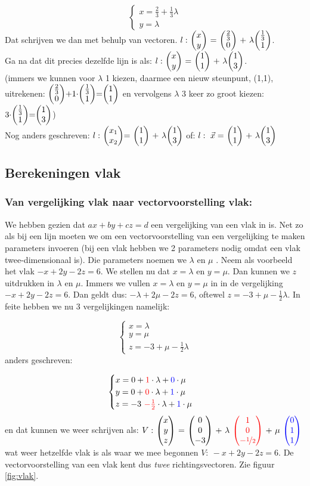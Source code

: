 \[\begin{cases}
x = \frac{2}{3} + \frac{1}{3} \lambda\\
y =  \lambda 
\end{cases}
\] 
Dat schrijven we dan met behulp van vectoren. 
$ l: \  \vectwee {x}{y} \ = \ \vectwee {\frac{2}{3}}{0} \ +\  \lambda  \vectwee {\frac{1}{3}}{1}  $.\\
Ga na dat dit precies dezelfde lijn is als:
$ l: \  \vectwee {x}{y} \ = \ \vectwee {1}{1} \ +\  \lambda  \vectwee {1}{3}  $.\\ (immers we kunnen voor $ \lambda $ 1 kiezen, daarmee een nieuw steunpunt, (1,1), uitrekenen: $\vectwee{\frac{2}{3}}{0}+1\cdot\vectwee{\frac{1}{3}}{1}=\vectwee{1}{1} $ en vervolgens $ \lambda $ 3 keer zo groot kiezen: $3\cdot\vectwee{\frac{1}{3}}{1}=\vectwee{1}{3} $)\\
Nog anders geschreven:
$  l: \  \vectweesnel{x} =  \ \vectwee {1}{1} \ +\  \lambda  \vectwee {1}{3}  $ \qquad
of: $ l: \ \vec{x} = \ \vectwee{1}{1} \ + \ \lambda \vectwee {1}{3} $

\subsection{Berekeningen vlak}
\subsubsection{Van vergelijking vlak naar vectorvoorstelling vlak:}
We hebben gezien dat $ ax + by + cz = d $ een vergelijking van een vlak in \RD is. Net zo als bij een lijn moeten we om een vectorvoorstelling van een vergelijking te maken parameters invoeren (bij een vlak hebben we 2 parameters nodig omdat een vlak  twee-dimensionaal is). Die parameters noemen we $ \lambda $  en $ \mu $ . Neem als voorbeeld het vlak $ -x + 2y -2z = 6 $.  We stellen  nu dat $ x=  \lambda $ en $ y = \mu $. Dan kunnen we $ z$ uitdrukken in $ \lambda $  en $ \mu $. Immers we vullen  $ x=  \lambda $ en $ y = \mu $ in in de vergelijking $ -x + 2y -2z = 6 $. Dan geldt dus: $ -\lambda + 2\mu -2z = 6 $, oftewel $ z = -3 + \mu -   \frac{1}{2} \lambda $. In feite hebben we nu 3 vergelijkingen namelijk:

\[\begin{cases}
x =  \lambda\\
y =  \mu\\
z = -3 + \mu -   \frac{1}{2} \lambda 
\end{cases}
\] 
anders geschreven:

\[\begin{cases}
x =  0 + {\color{red}1}\cdot\lambda +  {\color{blue}0}\cdot\mu\\
y =  0 +  {\color{red}0}\cdot\lambda  + {\color{blue}1}\cdot \mu\\
z = -3 \  {\color{red}- \frac{1}{2}} \cdot\lambda + {\color{blue}1}\cdot\mu 
\end{cases}
\] 
en dat kunnen we weer schrijven als:
$ V: \ \vecdrie{x}{y}{z} \ = \ \vecdrie{0}{0}{-3} \ + \ \lambda \  \vecdrie[red]{1}{0}{-\nicefrac{1} {2}}   \ + \ \mu \ \vecdrie[blue]{0}{1}{1} $ wat weer hetzelfde vlak is als waar we mee begonnen $ V: \ -x + 2y -2z = 6 $.
De vectorvoorstelling van een vlak kent dus \textit{twee}  richtingsvectoren. 
Zie  figuur  \ref{fig:vlak}.

